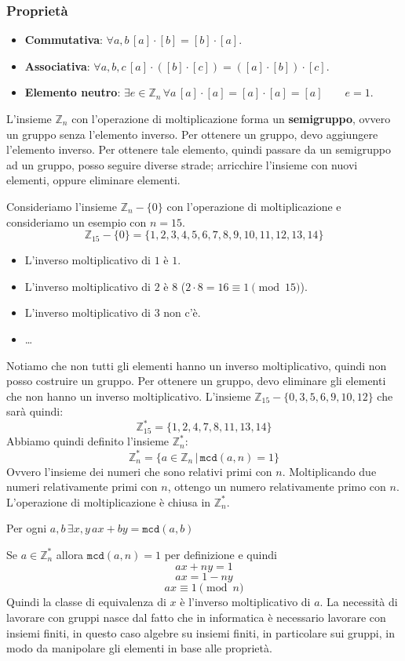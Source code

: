 \subsubsection{Proprietà}
\begin{itemize}
  \item \textbf{Commutativa}: $\forall a, b \,[a] \cdot [b] = [b] \cdot [a]$.
  \item \textbf{Associativa}: $\forall a, b, c \,[a] \cdot ([b] \cdot [c]) = ([a] \cdot [b]) \cdot [c]$.
  \item \textbf{Elemento neutro}: $\exists e \in \mathbb{Z}_n \, \forall a \, [a] \cdot [a] = [a] \cdot [a] = [a]\qquad e = 1$.
\end{itemize}
L'insieme $\mathbb{Z}_n$ con l'operazione di moltiplicazione forma un \textbf{semigruppo}, 
ovvero un gruppo senza l'elemento inverso.
Per ottenere un gruppo, devo aggiungere l'elemento inverso. Per ottenere tale elemento,
quindi passare da un semigruppo ad un gruppo, 
posso seguire diverse strade; arricchire l'insieme con nuovi elementi, oppure
eliminare elementi.

Consideriamo l'insieme $\mathbb{Z}_n - \{0\}$ con l'operazione di moltiplicazione e consideriamo 
un esempio con $n = 15$.
\[
  \mathbb{Z}_{15} - \{0\} = \{1,2,3,4,5,6,7,8,9,10,11,12,13,14\}
\]
\begin{itemize}
  \item L'inverso moltiplicativo di $1$ è $1$.
  \item L'inverso moltiplicativo di $2$ è $8$ ($2 \cdot 8 = 16 \equiv 1 \pmod{15}$).
  \item L'inverso moltiplicativo di $3$ non c'è.
  \item \dots
\end{itemize}
Notiamo che non tutti gli elementi hanno un inverso moltiplicativo, quindi non 
posso costruire un gruppo. Per ottenere un gruppo, devo eliminare gli elementi
che non hanno un inverso moltiplicativo.
L'insieme $\mathbb{Z}_{15} - \{0, 3, 5, 6, 9, 10, 12\}$ che sarà quindi:
\[
  \mathbb{Z}_{15}^* = \{1,2,4,7,8,11,13,14\}
\]
Abbiamo quindi definito l'insieme $\mathbb{Z}_n^*$:
\[
  \mathbb{Z}_n^* = \{a \in \mathbb{Z}_n \, | \, \texttt{mcd}(a, n) = 1\}
\]
Ovvero l'insieme dei numeri che sono relativi primi con $n$.
Moltiplicando due numeri relativamente primi con $n$, ottengo un numero
relativamente primo con $n$. L'operazione di moltiplicazione è chiusa in $\mathbb{Z}_n^*$.
\begin{theorem}
  Per ogni $a, b \, \exists x,y \, ax + by = \texttt{mcd}(a,b)$
\end{theorem}
Se $a \in \mathbb{Z}_n^*$ allora $\texttt{mcd}(a, n) = 1$ per definizione e quindi
\[
  ax + ny = 1
\] 
\[
  ax = 1 - ny
\]
\[
  ax \equiv 1 \pmod{n}
\]
Quindi la classe di equivalenza di $x$ è l'inverso moltiplicativo di $a$.
La necessità di lavorare con gruppi nasce dal fatto che in informatica
è necessario lavorare con insiemi finiti, in questo caso algebre su insiemi 
finiti, in particolare sui gruppi, in modo da manipolare gli elementi in 
base alle proprietà.
